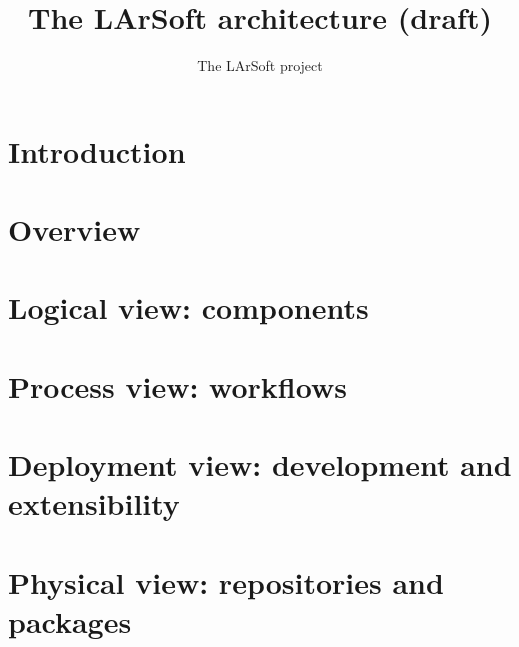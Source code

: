 \documentclass{article}
\begin{document}
\title{The LArSoft architecture (draft)}
\author{The LArSoft project}
\maketitle

\linenumbers

\tableofcontents

\section{Introduction}
\label{sec:introduction}




\section{Overview}
\label{sec:Overview}




\section{Logical view: components}
\label{sec:Components}




\section{Process view: workflows}
\label{sec:Workflows}




\section{Deployment view: development and extensibility}
\label{sec:Development}




\section{Physical view: repositories and packages}
\label{sec:Packages}








\clearpage
\appendix


% 
% 
\end{document}
